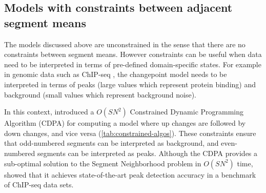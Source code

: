 \documentclass[article]{jss}
\begin{document}

\subsection{Models with constraints between adjacent segment means}


The models discussed above are unconstrained in the sense that there
are no constraints between segment means. However constraints can be
useful when data need to be interpreted in terms of pre-defined
domain-specific states. For example in genomic data such as ChIP-seq
\citep{chip-seq}, the changepoint model needs to be interpreted in
terms of peaks (large values which represent protein binding) and
background (small values which represent background noise).

In this context, \citet{HOCKING-PeakSeg} introduced a $O(SN^2)$
Constrained Dynamic Programming Algorithm (CDPA) for computing a model
where up changes are followed by down changes, and vice versa
(\ref{tab:constrained-algos}). These constraints ensure that
odd-numbered segments can be interpreted as background, and
even-numbered segments can be interpreted as peaks. Although the CDPA
provides a sub-optimal solution to the Segment Neighborhood problem in
$O(SN^2)$ time, \citet{HOCKING2016-chipseq} showed that it achieves
state-of-the-art peak detection accuracy in a benchmark of
ChIP-seq data sets. 

\end{document}
